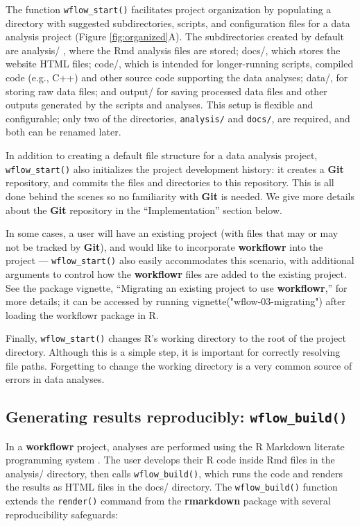 \documentclass[9pt,a4paper]{extarticle}
\begin{document}
The function \texttt{wflow\_start()} facilitates project organization by
populating a directory with suggested subdirectories, scripts, and
configuration files for a data analysis project (Figure \ref{fig:organized}A). The
subdirectories created by default are analysis/ , where the Rmd analysis
files are stored; docs/, which stores the website HTML files; code/,
which is intended for longer-running scripts, compiled code (e.g., C++)
and other source code supporting the data analyses; data/, for storing
raw data files; and output/ for saving processed data files and other
outputs generated by the scripts and analyses. This setup is flexible
and configurable; only two of the directories, \verb|analysis/| and
\verb|docs/|, are required, and both can be renamed later.

In addition to creating a default file structure for a data analysis
project, \texttt{wflow\_start()} also initializes the project development history:
it creates a \textbf{Git} repository, and commits the files and directories to
this repository. This is all done behind the scenes so no familiarity
with \textbf{Git} is needed. We give more details about the \textbf{Git} repository in the
“Implementation” section below.

In some cases, a user will have an existing project (with files that may
or may not be tracked by \textbf{Git}), and would like to incorporate \textbf{workflowr}
into the project --- \texttt{wflow\_start()} also easily accommodates this
scenario, with additional arguments to control how the \textbf{workflowr} files
are added to the existing project. See the package vignette, “Migrating
an existing project to use \textbf{workflowr},” for more details; it can be
accessed by running vignette("wflow-03-migrating") after loading the
workflowr package in R.

Finally, \texttt{wflow\_start()} changes R’s working directory to the root of the
project directory. Although this is a simple step, it is important for
correctly resolving file paths. Forgetting to change the working
directory is a very common source of errors in data analyses.

\subsection*{Generating results reproducibly: \texttt{wflow\_build()}}

In a \textbf{workflowr} project, analyses are performed using the R Markdown
literate programming system \cite{Xie2018}. The user develops their R
code inside Rmd files in the analysis/ directory, then calls
\texttt{wflow\_build()}, which runs the code and renders the results as HTML files
in the docs/ directory. The \texttt{wflow\_build()} function extends the \texttt{render()}
command from the \textbf{rmarkdown} package with several reproducibility
safeguards:
\end{document}
